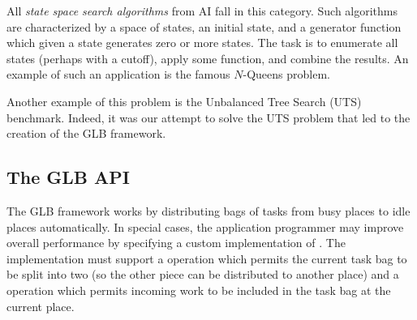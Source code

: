 All {\em state space search algorithms} from AI fall in this
category. Such algorithms are characterized by a space of states, an
initial state, and a generator function which given a state generates
zero or more states. The task is to enumerate all states (perhaps with
a cutoff), apply some function, and combine the results. An example of
such an application is the famous $N$-Queens problem.

Another example of this problem is the Unbalanced Tree Search (UTS)
benchmark. Indeed, it was our attempt to solve the UTS problem that
led to the creation of the GLB framework.

\subsection{The GLB API}
The GLB framework works by distributing bags of tasks from busy places
to idle places automatically. In special cases, the application
programmer may improve overall performance by specifying a custom
implementation of . The implementation must support a
 operation which permits the current task bag to be split
into two (so the other piece can be distributed to another place) and
a  operation which permits incoming work to be included in
the task bag at the current place. 

